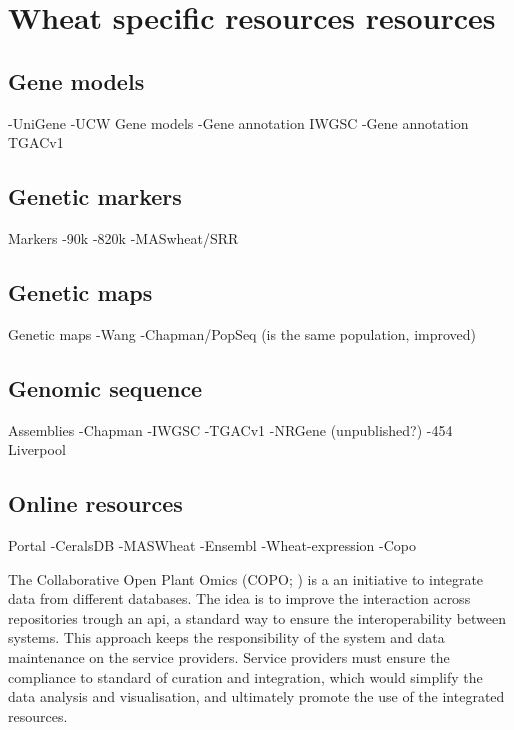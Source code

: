 \section{Wheat specific resources resources}
\label{lit:wheatResourcers}


\subsection{Gene models}
-UniGene
-UCW Gene models
-Gene annotation IWGSC
-Gene annotation TGACv1

\subsection{Genetic markers}


Markers
-90k
-820k
-MASwheat/SRR

\subsection{Genetic maps}
Genetic maps
-Wang
-Chapman/PopSeq (is the same population, improved)

\subsection{Genomic sequence}
Assemblies
-Chapman
-IWGSC
-TGACv1
-NRGene (unpublished?)
-454 Liverpool

\subsection{Online resources}
Portal
-CeralsDB
-MASWheat
-Ensembl
-Wheat-expression
-Copo

The Collaborative Open Plant Omics (COPO; \citealt{Davey2015}) is a an initiative to integrate data from different databases. 
The idea is to improve the interaction across repositories trough an \gls{api}, a standard way to ensure the interoperability between systems. 
This approach keeps the responsibility of the system and data maintenance on the service providers. 
Service providers must ensure the compliance to standard of curation and integration, which would simplify the data analysis and visualisation, and ultimately promote the use of the integrated resources.  






